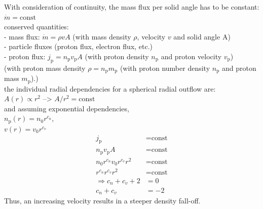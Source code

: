 

With consideration of continuity, the mass flux per solid angle has to be constant: $\dot{m} = \text{const}$\\
conserved quantities:\\
- mass flux: $\dot{m} = \rho v A$ (with mass density $\rho$, velocity $v$ and solid angle A)\\
- particle fluxes (proton flux, electron flux, etc.)\\
	- proton flux: $j_\text{p} = n_\text{p} v_\text{p} A$ (with proton density $n_\text{p}$ and proton velocity $v_\text{p}$)\\

(with proton mass density $\rho = n_\text{p} m_\text{p}$ (with proton number density $n_\text{p}$ and proton mass $m_\text{p}$).)\\

the individual radial dependencies for a spherical radial outflow are:\\
$A(r) \propto r^2$ --> $A/r^2 = \text{const}$\\
and assuming exponential dependencies,\\
$n_{\text{p}}(r) = n_0 r^{c_n}$,\\
$v(r) = v_0 r^{c_v}$\\
\begin{align}
	j_\text{p} &= \text{const}\\
	n_\text{p} v_\text{p} A &= \text{const}\\
	n_0 r^{c_n} v_0 r^{c_v} r^2 &= \text{const}\\
	r^{c_n} r^{c_v} r^2 &= \text{const}\\
	\Rightarrow c_n + c_v + 2 &= 0\\
	c_n + c_v &= -2
\end{align}
Thus, an increasing velocity results in a steeper density fall-off.\\


